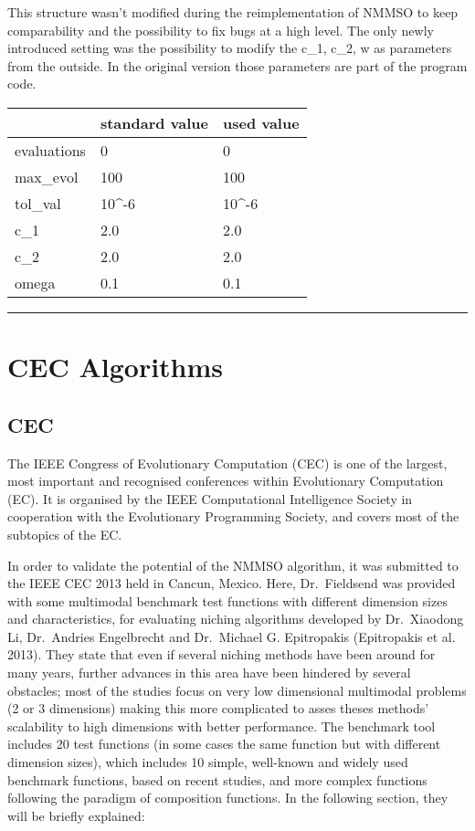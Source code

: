 \documentclass[12pt,a4paper]{article}
\begin{document}
This structure wasn't modified during the reimplementation of NMMSO to
keep comparability and the possibility to fix bugs at a high level. The
only newly introduced setting was the possibility to modify the c\_1,
c\_2, w as parameters from the outside. In the original version those
parameters are part of the program code.

\begin{longtable}[c]{@{}lll@{}}
\toprule
& standard value & used value\tabularnewline
\midrule
\endhead
evaluations & 0 & 0\tabularnewline
max\_evol & 100 & 100\tabularnewline
tol\_val & 10\^{}-6 & 10\^{}-6\tabularnewline
c\_1 & 2.0 & 2.0\tabularnewline
c\_2 & 2.0 & 2.0\tabularnewline
omega & 0.1 & 0.1\tabularnewline
\bottomrule
\end{longtable}

\begin{center}\rule{0.5\linewidth}{\linethickness}\end{center}

\section{CEC Algorithms}\label{cec-algorithms}

\subsection{CEC}\label{cec}

The IEEE Congress of Evolutionary Computation (CEC) is one of the
largest, most important and recognised conferences within Evolutionary
Computation (EC). It is organised by the IEEE Computational Intelligence
Society in cooperation with the Evolutionary Programming Society, and
covers most of the subtopics of the EC.

In order to validate the potential of the NMMSO algorithm, it was
submitted to the IEEE CEC 2013 held in Cancun, Mexico. Here,
Dr.~Fieldsend was provided with some multimodal benchmark test functions
with different dimension sizes and characteristics, for evaluating
niching algorithms developed by Dr.~Xiaodong Li, Dr.~Andries Engelbrecht
and Dr.~Michael G. Epitropakis (Epitropakis et al. 2013). They state
that even if several niching methods have been around for many years,
further advances in this area have been hindered by several obstacles;
most of the studies focus on very low dimensional multimodal problems (2
or 3 dimensions) making this more complicated to asses theses methods'
scalability to high dimensions with better performance. The benchmark
tool includes 20 test functions (in some cases the same function but
with different dimension sizes), which includes 10 simple, well-known
and widely used benchmark functions, based on recent studies, and more
complex functions following the paradigm of composition functions. In
the following section, they will be briefly explained:
\end{document}
